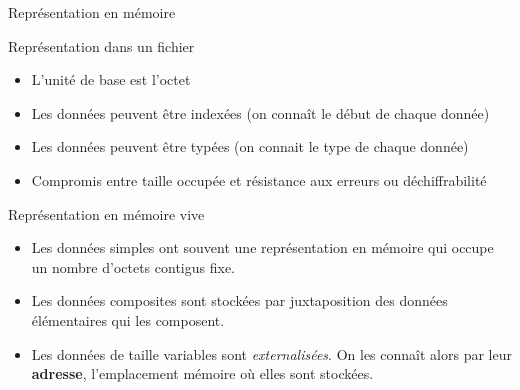\begin{frame}{Représentation en mémoire}
  \begin{block}{Représentation dans un fichier}
    \begin{itemize}
    \item L'unité de base est l'octet
    \item Les données peuvent être indexées (on connaît le début de chaque
      donnée)
    \item Les données peuvent être typées (on connait le type de chaque
      donnée)
    \item Compromis entre taille occupée et résistance aux erreurs ou
      déchiffrabilité
    \end{itemize}
  \end{block}
  \begin{block}{Représentation en mémoire vive}
    \begin{itemize}
    \item Les données simples ont souvent une représentation en mémoire qui
      occupe un nombre d'octets contigus fixe.
    \item Les données composites sont stockées par juxtaposition des données
      élémentaires qui les composent.
    \item Les données de taille variables sont \emph{externalisées}. On les
      connaît alors par leur \textbf{adresse}, l'emplacement mémoire où elles
      sont stockées.
    \end{itemize}
  \end{block}
\end{frame}
